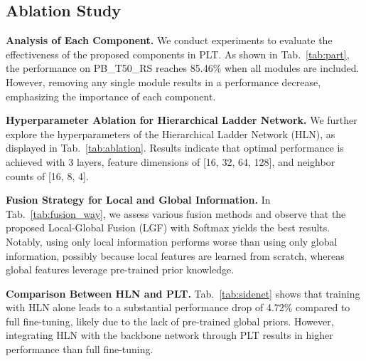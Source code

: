 



\subsection{Ablation Study}

\textbf{Analysis of Each Component.} We conduct experiments to evaluate the effectiveness of the proposed components in PLT. As shown in Tab.~\ref{tab:part}, the performance on PB\_T50\_RS reaches 85.46\% when all modules are included. However, removing any single module results in a performance decrease, emphasizing the importance of each component.

\textbf{Hyperparameter Ablation for Hierarchical Ladder Network.} We further explore the hyperparameters of the Hierarchical Ladder Network (HLN), as displayed in Tab.~\ref{tab:ablation}. Results indicate that optimal performance is achieved with 3 layers, feature dimensions of [16, 32, 64, 128], and neighbor counts of [16, 8, 4].

\textbf{Fusion Strategy for Local and Global Information.} In Tab.~\ref{tab:fusion_way}, we assess various fusion methods and observe that the proposed Local-Global Fusion (LGF) with Softmax yields the best results. Notably, using only local information performs worse than using only global information, possibly because local features are learned from scratch, whereas global features leverage pre-trained prior knowledge.

\textbf{Comparison Between HLN and PLT.} Tab.~\ref{tab:sidenet} shows that training with HLN alone leads to a substantial performance drop of 4.72\% compared to full fine-tuning, likely due to the lack of pre-trained global priors. However, integrating HLN with the backbone network through PLT results in higher performance than full fine-tuning.



